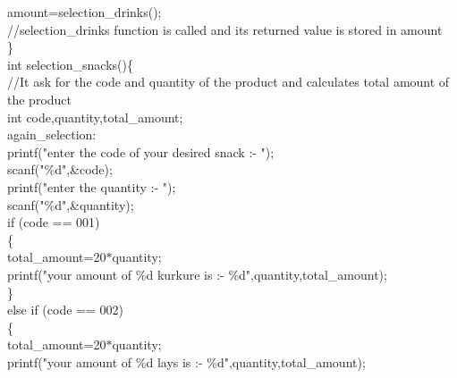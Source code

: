 \documentclass[10pt,a4paper]{article}
\begin{document}
\begin{flushleft}
    \hspace*{0.5cm}  amount=selection\_drinks();\\    //selection\_drinks function is called and its returned value is stored in amount\\
\}\\
int selection\_snacks()\{\\  //It ask for the code and quantity of the product and calculates total amount of the product \\
    \hspace*{0.5cm}  int code,quantity,total\_amount;\\
    \hspace*{0.5cm}  again\_selection:\\
    \hspace*{0.5cm}  printf("enter the code of your desired snack :- ");\\
    \hspace*{0.5cm}  scanf("\%d",\&code);\\
    \hspace*{0.5cm}  printf("enter the quantity :- ");\\
    \hspace*{0.5cm}  scanf("\%d",\&quantity);\\
    \hspace*{0.5cm}  if (code == 001)\\
    \hspace*{0.5cm}  \{\\
    \hspace*{0.5cm}  \hspace*{0.5cm}total\_amount=20$\ast$quantity;\\
    \hspace*{0.5cm}  \hspace*{0.5cm}printf("your amount of \%d kurkure is :- \%d",quantity,total\_amount);\\
    \hspace*{0.5cm}  \}\\
    \hspace*{0.5cm}  else if (code == 002)\\
    \hspace*{0.5cm}  \{\\
    \hspace*{0.5cm}  \hspace*{0.5cm}total\_amount=20$\ast$quantity;\\
    \hspace*{0.5cm}  \hspace*{0.5cm}printf("your amount of \%d lays is :- \%d",quantity,total\_amount);\\

\end{flushleft}
\end{document}
